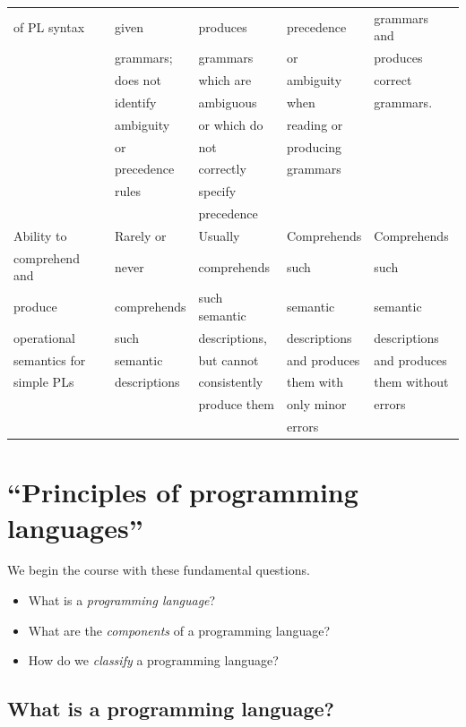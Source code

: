 \documentclass[11pt]{article}
\theoremstyle{definition}
\begin{document}
\begin{scriptsize}
\begin{center}
\begin{tabular}{|l|l|l|l|l|}
of PL syntax & given & produces & precedence & grammars and \\
 & grammars; & grammars & or & produces \\
 & does not & which are & ambiguity & correct \\
 & identify & ambiguous & when & grammars. \\
 & ambiguity & or which do & reading or & \\
 & or & not & producing & \\
 & precedence & correctly & grammars & \\
 & rules & specify & & \\
 & & precedence & & \\
\hline
Ability to & Rarely or & Usually & Comprehends & Comprehends \\
comprehend and & never & comprehends & such & such \\
produce & comprehends & such semantic & semantic & semantic \\
operational & such & descriptions, & descriptions & descriptions \\
semantics for & semantic & but cannot & and produces & and produces \\
simple PLs & descriptions & consistently & them with & them without \\
 & & produce them & only minor & errors \\
 & & & errors & \\
\hline
\end{tabular}
\end{center}
\end{scriptsize}

\section{“Principles of programming languages”}
\label{sec:org86b4671}
We begin the course with these fundamental questions.

\begin{itemize}
\item What is a \emph{programming language}?
\item What are the \emph{components} of a programming language?
\item How do we \emph{classify} a programming language?
\end{itemize}

\subsection{What is a programming language?}
\label{sec:org5a26242}
\end{document}
